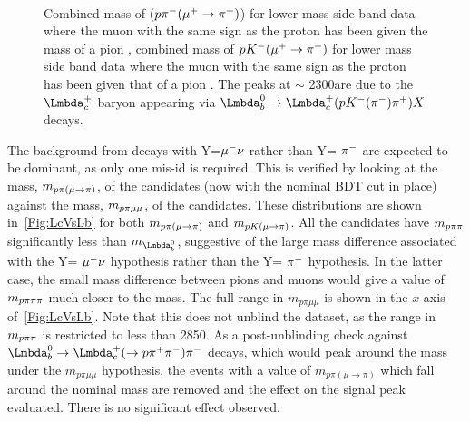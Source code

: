 \begin{figure}[!t]\def\nh{0.33\textwidth}

  \centering
  
  \textwidth\\
  \textwidth  

  
  \caption{ Combined mass of ($p{{\pi}^-}({\mu^+}\rightarrow{\ensuremath{{\pi}^+}})$) for \Lbpi lower mass side band data where the muon with the same sign as the proton has been given the mass of a pion \protect{}, combined mass of $p{{K}^-}({\mu^+}\rightarrow{\ensuremath{{\pi}^+}})$ for \LbK lower mass side band data where the muon with the same sign as the proton has been given that of a pion \protect{}. The peaks at $\sim$ 2300\mevcc are due to the $\Lc$ baryon appearing via $\Lb\to\Lc(p\Km(\pim)\pip)X$ decays.}
  \label{Fig:Lcpeak}  

\end{figure}
The background from decays with Y=${\mu^-}\nu$ rather than Y= ${{\pi}^-}$ are expected to be dominant, as only one mis-id is required. This is verified by looking at the  mass, $m_{{p}\pi(\mu\rightarrow\pi)}$, of the \Lc candidates (now with the nominal BDT cut in place) against the mass, $m_{{p}\pi\mu\mu}$, of the \Lb candidates. These distributions are shown in~\autoref{Fig:LcVsLb} for both $m_{{p}\pi(\mu\rightarrow\pi)}$ and $m_{{p}{K}(\mu\rightarrow\pi)}$. All the \Lc candidates have $m_{{p}\pi\pi}$ significantly less than $m_{\Lb}$, suggestive of the large mass difference associated with the Y= ${\mu^-}\nu$ hypothesis rather than the Y= ${{\pi}^-}$ hypothesis. In the latter case, the small mass difference between pions and muons would give a value of $m_{{p}\pi\pi\pi}$ much closer to the \Lb mass. The full range in $m_{p\pi\mu\mu}$ is shown in the $x$ axis of~\autoref{Fig:LcVsLb}\protect{}. Note that this does not unblind the \Lbpi dataset, as the range in $m_{{p}\pi\pi}$ is restricted to less than 2850\mevcc. %
As a post-unblinding check against $\Lb \to \Lc (\to \proton \pip \pim) \pim$ decays, which would peak around the \Lb mass under the $m_{p\pi\mu\mu}$ hypothesis, the events with a value of $m_{p\pi(\mu\to\pi)}$ which fall around the nominal \Lc mass are removed and the effect on the \Lbpi signal peak evaluated. There is no significant effect observed. %


